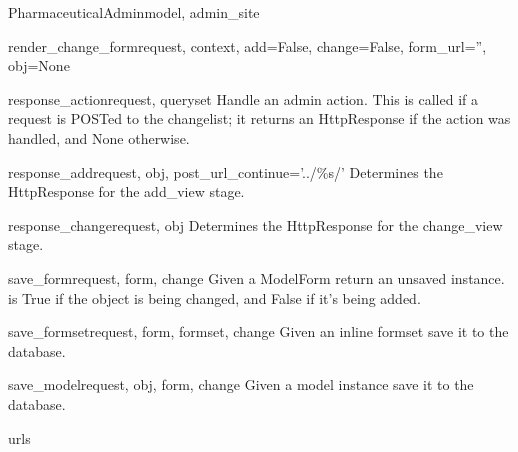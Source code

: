\documentclass[letterpaper,10pt,english]{sphinxmanual}
\begin{document}
\begin{classdesc}{PharmaceuticalAdmin}{model, admin\_site}
\hypertarget{data.admin.PharmaceuticalAdmin.render_change_form}{}\begin{methoddesc}{render\_change\_form}{request, context, add=False, change=False, form\_url='', obj=None}\end{methoddesc}

\hypertarget{data.admin.PharmaceuticalAdmin.response_action}{}\begin{methoddesc}{response\_action}{request, queryset}
Handle an admin action. This is called if a request is POSTed to the
changelist; it returns an HttpResponse if the action was handled, and
None otherwise.
\end{methoddesc}

\hypertarget{data.admin.PharmaceuticalAdmin.response_add}{}\begin{methoddesc}{response\_add}{request, obj, post\_url\_continue='../\%s/'}
Determines the HttpResponse for the add\_view stage.
\end{methoddesc}

\hypertarget{data.admin.PharmaceuticalAdmin.response_change}{}\begin{methoddesc}{response\_change}{request, obj}
Determines the HttpResponse for the change\_view stage.
\end{methoddesc}

\hypertarget{data.admin.PharmaceuticalAdmin.save_form}{}\begin{methoddesc}{save\_form}{request, form, change}
Given a ModelForm return an unsaved instance.  is True if
the object is being changed, and False if it's being added.
\end{methoddesc}

\hypertarget{data.admin.PharmaceuticalAdmin.save_formset}{}\begin{methoddesc}{save\_formset}{request, form, formset, change}
Given an inline formset save it to the database.
\end{methoddesc}

\hypertarget{data.admin.PharmaceuticalAdmin.save_model}{}\begin{methoddesc}{save\_model}{request, obj, form, change}
Given a model instance save it to the database.
\end{methoddesc}

\hypertarget{data.admin.PharmaceuticalAdmin.urls}{}\begin{memberdesc}{urls}\end{memberdesc}
\end{classdesc}
\end{document}

